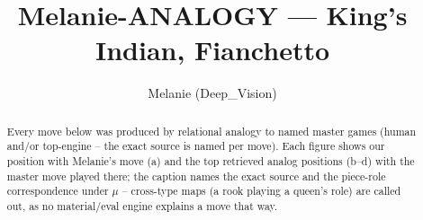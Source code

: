 \documentclass[11pt]{article}
\title{Melanie-ANALOGY — King's Indian, Fianchetto}
\author{Melanie (Deep\_Vision)}
\date{}
\begin{document}
\maketitle

\begin{abstract}Every move below was produced by relational analogy to named master games (human and/or top-engine -- the exact source is named per move). Each figure shows our position with Melanie's move (a) and the top retrieved analog positions (b--d) with the master move played there; the caption names the exact source and the piece-role correspondence under $\mu$ -- cross-type maps (a rook playing a queen's role) are called out, as no material/eval engine explains a move that way.\end{abstract}

\begin{figure}[p]\centering
\begin{subfigure}{0.46\textwidth}\centering
\resizebox{\linewidth}{!}{%
\newchessgame
\chessboard[
  setfen={r1bq1rk1/pppnppbp/3p1np1/8/2PP4/2N2NP1/PP2PPBP/R1BQK2R w KQ - 3 7},
  showmover=false,
  pgfstyle=straightmove, color=movearrow, markmove={e1-g1}
]}
\caption{}
\end{subfigure}\hfill
\begin{subfigure}{0.46\textwidth}\centering
\resizebox{\linewidth}{!}{%
\newchessgame
\chessboard[
  setfen={r1bqk2r/pp2ppbp/2n2np1/3p4/3P4/2P2N2/PP1NBPPP/R1BQ1RK1 b kq - 0 8},
  showmover=false,
  pgfstyle=straightmove, color=movearrow, markmove={e8-g8}
]}
\caption{}
\end{subfigure}
\\[4pt]
\begin{subfigure}{0.46\textwidth}\centering
\resizebox{\linewidth}{!}{%
\newchessgame
\chessboard[
  setfen={r1bqk2r/pp2ppbp/2n2np1/3p4/3P4/2P2N2/PP1NBPPP/R1BQ1RK1 b kq - 0 8},
  showmover=false,
  pgfstyle=straightmove, color=movearrow, markmove={e8-g8}
]}
\caption{}
\end{subfigure}\hfill
\begin{subfigure}{0.46\textwidth}\centering
\resizebox{\linewidth}{!}{%
\newchessgame
\chessboard[
  setfen={r1bq1rk1/ppp2pbp/2nppnp1/8/2PP4/P1N2NP1/1P2PPBP/R1BQK2R w KQ - 3 8},
  showmover=false,
  pgfstyle=straightmove, color=movearrow, markmove={e1-g1}
]}
\caption{}
\end{subfigure}

\end{figure}
\end{document}
